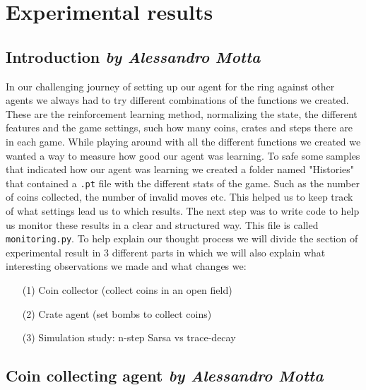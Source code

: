 \chapter{Experimental results}
\section[Introduction]{Introduction \hfill \small \normalfont\textit{by Alessandro Motta}}

In our challenging journey of setting up our agent for the ring against other agents we always had to try different combinations of the functions we created. These are the reinforcement learning method, normalizing the state, the different features and the game settings, such how many coins, crates and steps there are in each game. While playing around with all the different functions we created we wanted a way to measure how good our agent was learning. To safe some samples that indicated how our agent was learning we created a folder named "Histories" that contained a \texttt{.pt} file with the different stats of the game. Such as the number of coins collected, the number of invalid moves etc. This helped us to  keep track of what settings lead us to which results. The next step was to write code to help us monitor these results in a clear and structured way. This file is called \texttt{monitoring.py}. To help explain our thought process we will divide the section of experimental result in 3 different parts in which we will also explain what interesting observations we made and what changes we: 
\begin{itemize}
\item[(1)] Coin collector (collect coins in an open field)
\item[(2)] Crate agent (set bombs to collect coins)
\item[(3)] Simulation study: n-step Sarsa vs trace-decay
\end{itemize}

\section[Coin collecting agent ]{Coin collecting agent  \hfill \small \normalfont\textit{by Alessandro Motta}}
